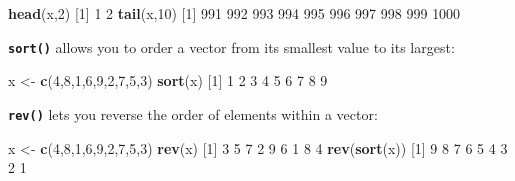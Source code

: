 \documentclass[
]{book}
\newenvironment{Shaded}{\begin{snugshade}}{\end{snugshade}}
\newcommand{\DecValTok}[1]{\textcolor[rgb]{0.00,0.00,0.81}{#1}}
\newcommand{\KeywordTok}[1]{\textcolor[rgb]{0.13,0.29,0.53}{\textbf{#1}}}
\newcommand{\NormalTok}[1]{#1}
\newcommand{\StringTok}[1]{\textcolor[rgb]{0.31,0.60,0.02}{#1}}
\begin{document}
\begin{Shaded}
\begin{Highlighting}[]
\KeywordTok{head}\NormalTok{(x,}\DecValTok{2}\NormalTok{)}
\NormalTok{[}\DecValTok{1}\NormalTok{] }\DecValTok{1} \DecValTok{2}
\KeywordTok{tail}\NormalTok{(x,}\DecValTok{10}\NormalTok{)}
\NormalTok{ [}\DecValTok{1}\NormalTok{]  }\DecValTok{991}  \DecValTok{992}  \DecValTok{993}  \DecValTok{994}  \DecValTok{995}  \DecValTok{996}  \DecValTok{997}  \DecValTok{998}  \DecValTok{999} \DecValTok{1000}
\end{Highlighting}
\end{Shaded}

\textbf{\texttt{sort()}} allows you to order a vector from its smallest value to its largest:

\begin{Shaded}
\begin{Highlighting}[]
\NormalTok{x <-}\StringTok{ }\KeywordTok{c}\NormalTok{(}\DecValTok{4}\NormalTok{,}\DecValTok{8}\NormalTok{,}\DecValTok{1}\NormalTok{,}\DecValTok{6}\NormalTok{,}\DecValTok{9}\NormalTok{,}\DecValTok{2}\NormalTok{,}\DecValTok{7}\NormalTok{,}\DecValTok{5}\NormalTok{,}\DecValTok{3}\NormalTok{)}
\KeywordTok{sort}\NormalTok{(x)}
\NormalTok{[}\DecValTok{1}\NormalTok{] }\DecValTok{1} \DecValTok{2} \DecValTok{3} \DecValTok{4} \DecValTok{5} \DecValTok{6} \DecValTok{7} \DecValTok{8} \DecValTok{9}
\end{Highlighting}
\end{Shaded}

\textbf{\texttt{rev()}} lets you reverse the order of elements within a vector:

\begin{Shaded}
\begin{Highlighting}[]
\NormalTok{x <-}\StringTok{ }\KeywordTok{c}\NormalTok{(}\DecValTok{4}\NormalTok{,}\DecValTok{8}\NormalTok{,}\DecValTok{1}\NormalTok{,}\DecValTok{6}\NormalTok{,}\DecValTok{9}\NormalTok{,}\DecValTok{2}\NormalTok{,}\DecValTok{7}\NormalTok{,}\DecValTok{5}\NormalTok{,}\DecValTok{3}\NormalTok{)}
\KeywordTok{rev}\NormalTok{(x)}
\NormalTok{[}\DecValTok{1}\NormalTok{] }\DecValTok{3} \DecValTok{5} \DecValTok{7} \DecValTok{2} \DecValTok{9} \DecValTok{6} \DecValTok{1} \DecValTok{8} \DecValTok{4}
\KeywordTok{rev}\NormalTok{(}\KeywordTok{sort}\NormalTok{(x))}
\NormalTok{[}\DecValTok{1}\NormalTok{] }\DecValTok{9} \DecValTok{8} \DecValTok{7} \DecValTok{6} \DecValTok{5} \DecValTok{4} \DecValTok{3} \DecValTok{2} \DecValTok{1}
\end{Highlighting}
\end{Shaded}
\end{document}
